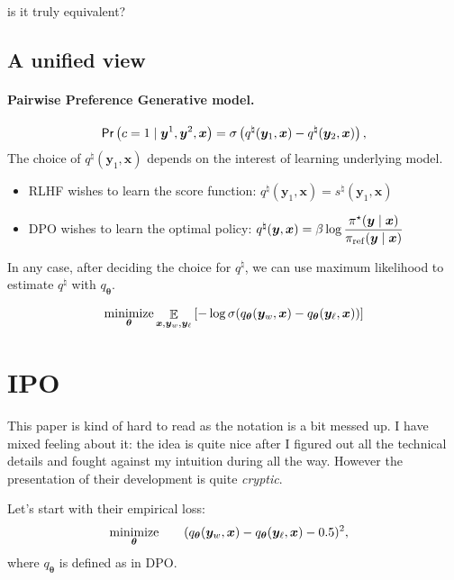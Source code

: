 \documentclass[11pt,a4paper]{article}
\begin{document}
{\blue is it truly equivalent?}

\subsection{A unified view}%
\label{sub:a_unified_view}
\paragraph{Pairwise Preference Generative model.} 
\[
\textsf{Pr}\left(c=1\mid \bm{y}^{1}, \bm{y}^{2}, \bm{x}\right) = \sigma\left(q^{\natural}(\bm{y}_1, \bm{x}) - q^{\natural}(\bm{y}_2, \bm{x})\right),
\] 
The choice of $q^{\natural}(\bm{y}_{1}, \bm{x})$ depends on the interest of learning underlying model.
\begin{itemize}
    \item RLHF wishes to learn the score function: $q^{\natural}(\bm{y}_1, \bm{x}) = s^{\natural}(\bm{y}_1, \bm{x})$
    \item DPO wishes to learn the optimal policy: $q^{\natural}(\bm{y}, \bm{x}) = \beta \log \dfrac{\pi^{\star }(\bm{y} \mid \bm{x})}{\pi_{\rm ref}(\bm{y}\mid \bm{x})}$
\end{itemize}
In any case, after deciding the choice for $q^{\natural}$, we can use maximum likelihood to estimate $q^{\natural}$ with $q_{\boldsymbol \theta}$.

\begin{equation}
\label{eq:unified_loss}
\operatorname*{\text{minimize}}_{\boldsymbol \theta} \mathop{\mathbb{E}}_{\bm{x}, \bm{y}_w, \bm{y}_{\ell }} \left[- \log \sigma (q_{\boldsymbol \theta}(\bm{y}_w, \bm{x}) - q_{\boldsymbol \theta}(\bm{y}_{\ell }, \bm{x})) \right]
\end{equation} 
\section{IPO}%
\label{sec:ipo}
This paper is kind of hard to read as the notation is a bit messed up. I have mixed feeling about it: the idea is quite nice after I figured out all the technical details and fought against my intuition during all the way. However the presentation of their development is quite \textit{cryptic}. 

Let's start with their empirical loss:
\begin{alignat*}{2}
    & \operatorname*{\text{minimize}}_{\boldsymbol \theta} \quad &&  (q_{\boldsymbol \theta}(\bm{y}_w,\bm{x}) - q_{\boldsymbol \theta}(\bm{y}_{\ell }, \bm{x}) - 0.5)^2,
\end{alignat*}
where $q_{\boldsymbol \theta}$ is defined as in DPO.
\end{document}
